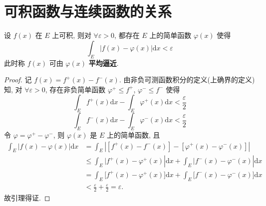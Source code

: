 \documentclass[../../main.tex]{subfiles}%
\begin{document}
\section{可积函数与连续函数的关系}

\begin{lemma}\label{lemma:引理4.3}
设 \( f(x) \) 在 \( E \) 上可积, 则对 \( \forall \varepsilon > 0 \), 都存在 \( E \) 上的简单函数 \( \varphi(x) \) 使得
\[
\int_E |f(x) - \varphi(x)|\mathrm{d}x < \varepsilon
\]
此时称 \( f(x) \) 可由 \( \varphi(x) \) \textbf{平均逼近}.
\end{lemma}
\begin{proof}
记 \( f(x) = f^+(x) - f^-(x) \). 由非负可测函数积分的定义(上确界的定义)知, 对 \( \forall \varepsilon > 0 \), 存在非负简单函数 \( \varphi^+ \leqslant f^+ \), \( \varphi^- \leqslant f^- \) 使得
\[
\int_E f^+(x)\mathrm{d}x - \int_E \varphi^+(x)\mathrm{d}x < \frac{\varepsilon}{2}
\]
\[
\int_E f^-(x)\mathrm{d}x - \int_E \varphi^-(x)\mathrm{d}x < \frac{\varepsilon}{2}
\]
令 \( \varphi = \varphi^+ - \varphi^- \), 则 \( \varphi(x) \) 是 \( E \) 上的简单函数, 且
\begin{align*}
\int_E{|f(x)}-\varphi (x)|\mathrm{d}x &=\int_E{\left| \left[ f^+\left( x \right) -f^-\left( x \right) \right] -\left[ \varphi ^+\left( x \right) -\varphi ^-\left( x \right) \right] \right|}
\\
&\leqslant \int_E{|f^+(x)}-\varphi ^+(x)|\mathrm{d}x +\int_E{|f^-(x)}-\varphi ^-(x)|\mathrm{d}x 
\\
&=\int_E{[f^+(x)}-\varphi ^+(x)]\mathrm{d}x +\int_E{[f^-(x)}-\varphi ^-(x)]\mathrm{d}x 
\\
&<\frac{\varepsilon}{2}+\frac{\varepsilon}{2}=\varepsilon .
\end{align*}
故引理得证.
\end{proof}
\end{document}
